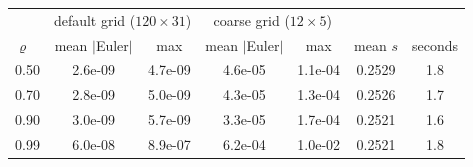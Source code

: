 \begin{tabular}{lcccccc}
\toprule
& \multicolumn{2}{c}{default grid ($120 \times 31$)} & \multicolumn{2}{c}{coarse grid ($12 \times 5$)} & & \\
$\varrho$ & mean $|$Euler$|$ & max & mean $|$Euler$|$ & max & mean $s$ & seconds \\
\midrule
0.50 & 2.6e-09 & 4.7e-09 & 4.6e-05 & 1.1e-04 & 0.2529 & 1.8 \\
0.70 & 2.8e-09 & 5.0e-09 & 4.3e-05 & 1.3e-04 & 0.2526 & 1.7 \\
0.90 & 3.0e-09 & 5.7e-09 & 3.3e-05 & 1.7e-04 & 0.2521 & 1.6 \\
0.99 & 6.0e-08 & 8.9e-07 & 6.2e-04 & 1.0e-02 & 0.2521 & 1.8 \\
\bottomrule
\end{tabular}
